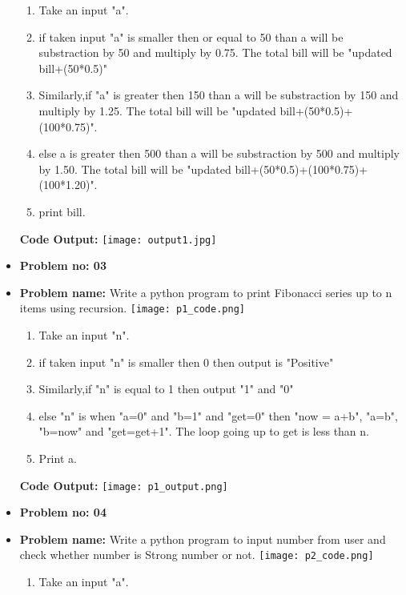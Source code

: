 \documentclass[a4paper]{article}
\begin{document}
\begin{itemize}
\begin{enumerate}
    \item Take an input "a".
    \item if taken input "a" is smaller then or equal to 50 than a will be substraction by 50 and multiply by 0.75. The total bill will be "updated bill+(50*0.5)"
    \item Similarly,if "a" is greater then 150 than a will be substraction by 150 and multiply by 1.25. The total bill will be "updated bill+(50*0.5)+(100*0.75)".
    \item else a is greater then 500 than  a will be substraction by 500 and multiply by 1.50. The total bill will be "updated bill+(50*0.5)+(100*0.75)+(100*1.20)".
    \item print bill.
\end{enumerate}  
\textbf{Code Output: }
\newline
\texttt{[image: output1.jpg]}
\pagebreak
\item\textbf{Problem no: 03}
\item \textbf{Problem name:} Write a python program to print Fibonacci series up to n items using recursion.
\newline
\texttt{[image: p1\_code.png]}
\newline
\begin{enumerate}
    \item Take an input "n".
    \item if taken input "n" is smaller then 0 then output is "Positive"
    \item Similarly,if "n" is equal to 1 then output "1" and "0"
    \item else "n" is when "a=0" and "b=1" and "get=0" then "now = a+b", "a=b", "b=now" and "get=get+1". The loop going up to get is less than n.
    \item Print a.
\end{enumerate}
\pagebreak
\textbf{Code Output: }
\newline
\texttt{[image: p1\_output.png]}
\item\textbf{Problem no: 04}
\item \textbf{Problem name:} Write a python program to input number from user and check whether number is Strong number or not.
\newline
\texttt{[image: p2\_code.png]}
\pagebreak
\begin{enumerate}
    \item Take an input "a".

\end{enumerate}
\end{itemize}
\end{document}
